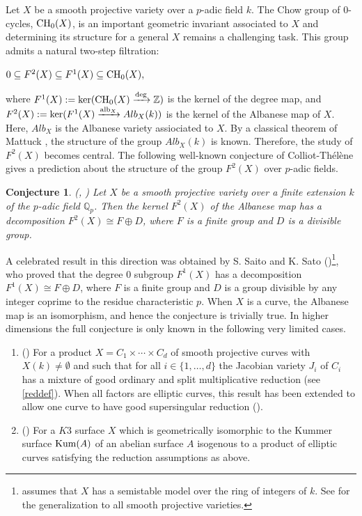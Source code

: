 \documentclass[12pt]{amsart}
\newtheorem{conj}[conj]{Conjecture}
\theoremstyle{remark}
\newcommand{\Q}{{\mathbb Q}}
\renewcommand{\1}{{\mathbb{S}}}
\newcommand{\alb}{{\rm alb}}
\newcommand{\CH}{{\rm CH}}
\newcommand{\<}{\langle}
\renewcommand{\>}{\rangle}
\newcommand{\Kum}{{\rm Kum}}
\begin{document}
Let $X$ be a smooth projective variety over a $p$-adic field $k$. The Chow group of $0$-cycles, $\CH_{0}(X)$, is an important geometric invariant associated to $X$ and determining its structure for a general  $X$ remains a challenging task. This group admits a natural two-step filtration:
     \begin{center}
     	$0\subseteq F^{2}(X) \subseteq F^{1}(X) \subseteq \CH_{0}(X),$
     \end{center}
 where $F^{1}(X) :=  \ker(\CH_{0}(X) \xrightarrow{\deg} \mathbb{Z} )$ is the kernel of the degree map, and $F^{2}(X) :=  \ker(F^{1}(X) \xrightarrow{\alb_X} Alb_{X}(k) )$ is the kernel of the Albanese map of $X$. Here, $Alb_{X}$ is the Albanese variety assiociated to $X$. By a classical theorem of Mattuck \cite{Mat}, the structure of the group $Alb_{X}(k)$ is known. Therefore, the study of $F^{2}(X)$ becomes central.
 The following well-known conjecture of Colliot-Th\'{e}l\`{e}ne gives a prediction about the structure of the group $F^{2}(X)$ over $p$-adic fields. 

 
 

 
 
 \begin{conj}\label{mainconj} (\cite[1.4 (d, e, f)]{CT2}, \cite[Conjecture 3.5.4]{RS})  Let $X$ be a smooth projective variety  over a finite extension $k$ of the $p$-adic field $\Q_p$. Then  
 	the kernel $F^{2}(X)$ of the Albanese map has a decomposition $F^{2}(X) \cong F \oplus D$, where $F$ is a finite group and $D$ is a divisible group. 
 	\end{conj}

 

A celebrated result in this direction was obtained by S. Saito and K. Sato (\cite[Theorem 0.3]{SS})\footnote{\cite{SS} assumes that $X$ has a semistable model over the ring of integers of $k$. See \cite[Th\'{e}or\`{e}me 0.2]{CT3} for the generalization to all smooth projective varieties.}, who proved that the degree $0$ subgroup $F^1(X)$ has a decomposition $F^1(X)\cong F\oplus D$, where $F$ is a finite group and $D$ is a group divisible by any integer coprime to the residue characteristic $p$. When $X$ is a curve, the Albanese map is an isomorphism, and hence the conjecture is trivially true. In higher dimensions the full conjecture is only known in the following very limited cases. 
    
 
 \begin{enumerate}
 \item\label{item1} (\cite[Theorem 1.1]{RS}) For a product $X=C_1\times\cdots\times C_d$ of smooth projective curves with $X(k)\neq\emptyset$  and such that for all $i\in\{1,\ldots, d\}$ the Jacobian variety $J_i$ of $C_i$ has a mixture of  good ordinary and split multiplicative reduction (see \autoref{reddef}). When all factors are elliptic curves, this result has been extended to allow one curve to have good supersingular reduction (\cite[Theorem 1.2]{GL}). 
 \item (\cite[Theorem 1.2]{GL24}) For a $K3$ surface $X$ which is geometrically isomorphic to the Kummer surface $\Kum(A)$ of an abelian surface $A$ isogenous to a product of elliptic curves satisfying the reduction assumptions as above. 
 \end{enumerate}
\end{document}
